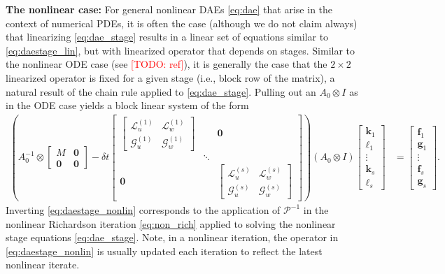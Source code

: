 \documentclass[review]{siamart}
\makeatletter
\newcommand{\todo}[1]{\textcolor{red}{[TODO\@: #1]}}
\makeatother
\begin{document}
\textbf{The nonlinear case:} For general nonlinear DAEs \eqref{eq:dae} that arise
in the context of numerical PDEs, it is often the case (although we do not
claim always) that linearizing \eqref{eq:dae_stage} results in a linear set of
equations similar to \eqref{eq:daestage_lin}, but with linearized operator that
depends on stages. Similar to the nonlinear ODE case (see \todo{ref}), it is
generally the case that the $2\times 2$ linearized operator is fixed for a
given stage (i.e., block row of the matrix), a natural result of the chain
rule applied to \eqref{eq:dae_stage}. Pulling out an $A_0\otimes I$ as
in the ODE case yields a block linear system of the form
%
{\small
\begin{align}\label{eq:daestage_nonlin}
\left( A_0^{-1}\otimes \begin{bmatrix}M & \mathbf{0} \\ \mathbf{0} & \mathbf{0}\end{bmatrix}
	- \delta t\begin{bmatrix}
		\begin{bmatrix} \mathcal{L}_{u}^{(1)} & \mathcal{L}_{w}^{(1)} \\
			\mathcal{G}_{u}^{(1)} & \mathcal{G}_w^{(1)} \end{bmatrix} & & \mathbf{0} \\
		& \ddots & \\
		\mathbf{0} &&\begin{bmatrix} \mathcal{L}_{u}^{(s)} & \mathcal{L}_{w}^{(s)} \\
			\mathcal{G}_{u}^{(s)} & \mathcal{G}_w^{(s)} \end{bmatrix}
	\end{bmatrix} \right)
	(A_0 \otimes I)
	\begin{bmatrix} \mathbf{k}_1 \\ \boldsymbol{\ell}_1 \\ \vdots \\
		\mathbf{k}_s \\ \boldsymbol{\ell}_s\end{bmatrix} 
& = \begin{bmatrix} \mathbf{f}_1 \\ \mathbf{g}_1 \\ \vdots \\
	\mathbf{f}_s \\ \mathbf{g}_s \end{bmatrix}.
\end{align}
}
%
Inverting \eqref{eq:daestage_nonlin} corresponds to the application of
$\mathcal{P}^{-1}$ in the nonlinear Richardson iteration \eqref{eq:non_rich}
applied to solving the nonlinear stage equations \eqref{eq:dae_stage}. Note,
in a nonlinear iteration, the operator in \eqref{eq:daestage_nonlin} is
usually updated each iteration to reflect the latest nonlinear iterate.
\end{document}
